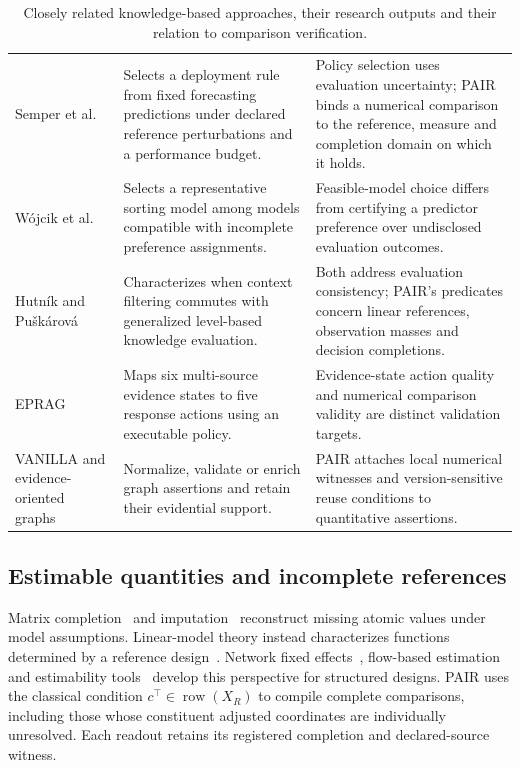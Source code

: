 \documentclass[preprint,12pt,number,sort&compress]{elsarticle}
\begin{document}
\begin{table}[t]
\centering\small{}
\caption{Closely related knowledge-based approaches, their research outputs and their relation to comparison verification.}
\label{tab:paradigms}
\begin{tabularx}{\textwidth}{@{}L{0.23\textwidth}L{0.34\textwidth}X@{}}
\toprule
{} &  & \\\midrule
Semper et al.~\cite{semper2026robust} & Selects a deployment rule from fixed forecasting predictions under declared reference perturbations and a performance budget. & Policy selection uses evaluation uncertainty; PAIR binds a numerical comparison to the reference, measure and completion domain on which it holds.\\
W\'{o}jcik et al.~\cite{wojcik2023representative} & Selects a representative sorting model among models compatible with incomplete preference assignments. & Feasible-model choice differs from certifying a predictor preference over undisclosed evaluation outcomes.\\
Hutn\'{i}k and Pu\v{s}k\'{a}rov\'{a}~\cite{hutnik2026localization} & Characterizes when context filtering commutes with generalized level-based knowledge evaluation. & Both address evaluation consistency; PAIR's predicates concern linear references, observation masses and decision completions.\\
EPRAG~\cite{kinalioglu2026eprag} & Maps six multi-source evidence states to five response actions using an executable policy. & Evidence-state action quality and numerical comparison validity are distinct validation targets.\\
VANILLA and evidence-oriented graphs~\cite{purohit2025vanilla,shamshiri2026security,mohamed2026orchestra} & Normalize, validate or enrich graph assertions and retain their evidential support. & PAIR attaches local numerical witnesses and version-sensitive reuse conditions to quantitative assertions.\\\bottomrule
\end{tabularx}
\end{table}

\subsection{Estimable quantities and incomplete references}
Matrix completion~\cite{mazumder2010softimpute} and imputation~\cite{vo2026pica} reconstruct missing atomic values under model assumptions. Linear-model theory instead characterizes functions determined by a reference design~\cite{searle1971linear,rao1971generalized,freeman1975incomplete}. Network fixed effects~\cite{jochmans2019network}, flow-based estimation~\cite{chen2025flows} and estimability tools~\cite{lenth2026estimability} develop this perspective for structured designs. PAIR uses the classical condition $c^\top\in\operatorname{row}(X_R)$ to compile complete comparisons, including those whose constituent adjusted coordinates are individually unresolved. Each readout retains its registered completion and declared-source witness.
\end{document}
